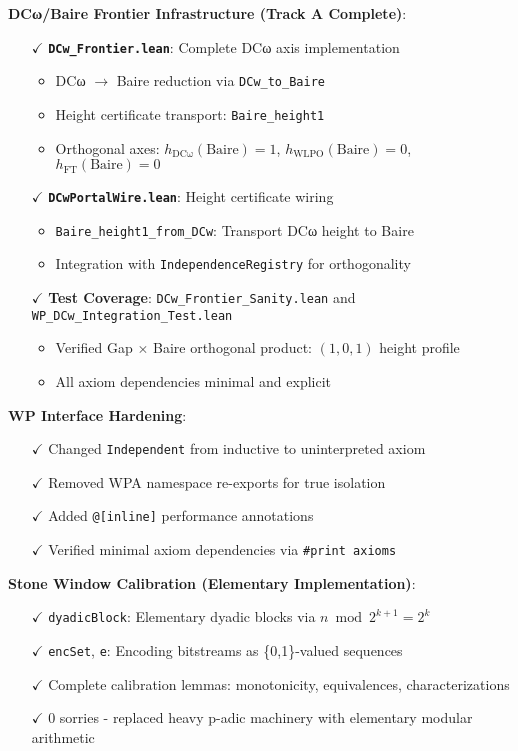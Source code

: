 \documentclass[11pt]{article}
\theoremstyle{definition}
\theoremstyle{remark}
\begin{document}
\textbf{DCω/Baire Frontier Infrastructure (Track A Complete)}:
\begin{itemize}
\item[$\checkmark$] \textbf{\texttt{DCw\_Frontier.lean}}: Complete DCω axis implementation
  \begin{itemize}
  \item DCω $\to$ Baire reduction via \texttt{DCw\_to\_Baire}
  \item Height certificate transport: \texttt{Baire\_height1}
  \item Orthogonal axes: $h_{\text{DCω}}(\text{Baire}) = 1$, $h_{\text{WLPO}}(\text{Baire}) = 0$, $h_{\text{FT}}(\text{Baire}) = 0$
  \end{itemize}
\item[$\checkmark$] \textbf{\texttt{DCwPortalWire.lean}}: Height certificate wiring
  \begin{itemize}
  \item \texttt{Baire\_height1\_from\_DCw}: Transport DCω height to Baire
  \item Integration with \texttt{IndependenceRegistry} for orthogonality
  \end{itemize}
\item[$\checkmark$] \textbf{Test Coverage}: \texttt{DCw\_Frontier\_Sanity.lean} and \texttt{WP\_DCw\_Integration\_Test.lean}
  \begin{itemize}
  \item Verified Gap $\times$ Baire orthogonal product: $(1,0,1)$ height profile
  \item All axiom dependencies minimal and explicit
  \end{itemize}
\end{itemize}

\textbf{WP Interface Hardening}:
\begin{itemize}
\item[$\checkmark$] Changed \texttt{Independent} from inductive to uninterpreted axiom
\item[$\checkmark$] Removed WPA namespace re-exports for true isolation
\item[$\checkmark$] Added \texttt{@[inline]} performance annotations
\item[$\checkmark$] Verified minimal axiom dependencies via \texttt{\#print axioms}
\end{itemize}

\textbf{Stone Window Calibration (Elementary Implementation)}:
\begin{itemize}
\item[$\checkmark$] \texttt{dyadicBlock}: Elementary dyadic blocks via $n \bmod 2^{k+1} = 2^k$
\item[$\checkmark$] \texttt{encSet}, \texttt{e}: Encoding bitstreams as \{0,1\}-valued sequences
\item[$\checkmark$] Complete calibration lemmas: monotonicity, equivalences, characterizations
\item[$\checkmark$] 0 sorries - replaced heavy p-adic machinery with elementary modular arithmetic
\end{itemize}
\end{document}
